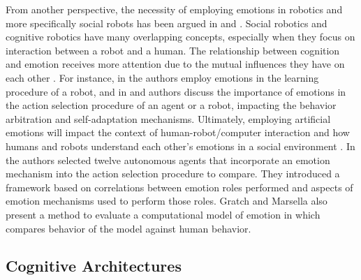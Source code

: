 \documentclass[12pt]{report}
\begin{document}
From another perspective, the necessity of employing emotions in robotics and
more specifically social robots has been argued in
\cite{pfeifer:robotics-emotion} and \cite{sloman:robots-emotion}. Social
robotics and cognitive robotics have many overlapping concepts, especially when
they focus on interaction between a robot and a human. The relationship between
cognition and emotion receives more attention due to the mutual influences they
have on each other
\cite{morse:robotic-modelling-cognition,scheutz:emotional-states-behavior}. For
instance, in \cite{gadanho:learning-emotions} the authors employ emotions in the
learning procedure of a robot, and in \cite{broekens:affect-action-selection} and
\cite{scheutz:emotion-action-behavior} authors discuss the importance of
emotions in the action selection procedure of an agent or a robot, impacting
the behavior arbitration and self-adaptation mechanisms. Ultimately, employing
artificial emotions will impact the context of human-robot/computer interaction
\cite{hudlicka:affect-HRI} and how humans and robots understand each other's
emotions in a social environment
\cite{kirby:social-robots,canamero:emotion-robot-perspective}. In
\cite{rumbell:comparative-emotions-functions} the authors selected twelve
autonomous agents that incorporate an emotion mechanism into the action
selection procedure to compare. They introduced a framework based on
correlations between emotion roles performed and aspects of emotion mechanisms
used to perform those roles. Gratch and Marsella also present a method to
evaluate a computational model of emotion in \cite{gratch:evaluating} which
compares behavior of the model against human behavior.

\subsection{Cognitive Architectures}
\end{document}
